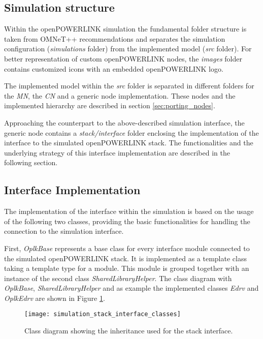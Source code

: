 \subsection{Simulation structure}
\label{sec:porting_stack_simstructure}
Within the openPOWERLINK simulation the fundamental folder structure is taken from OMNeT++ recommendations and separates the simulation configuration (\emph{simulations} folder) from the implemented model (\emph{src} folder).
For better representation of custom openPOWERLINK nodes, the \emph{images} folder contains customized icons with an embedded openPOWERLINK logo.

The implemented model within the \emph{src} folder is separated in different folders for the \emph{MN}, the \emph{CN} and a generic node implementation.
These nodes and the implemented hierarchy are described in section \ref{sec:porting_nodes}.

Approaching the counterpart to the above-described simulation interface, the generic node contains a \emph{stack/interface} folder enclosing the implementation of the interface to the simulated openPOWERLINK stack.
The functionalities and the underlying strategy of this interface implementation are described in the following section.

\subsection{Interface Implementation}
\label{sec:porting_stack_interface}
The implementation of the interface within the simulation is based on the usage of the following two classes, providing the basic functionalities for handling the connection to the simulation interface.

First, \emph{OplkBase} represents a base class for every interface module connected to the simulated openPOWERLINK stack.
It is implemented as a template class taking a template type for a module.
This module is grouped together with an instance of the second class \emph{SharedLibraryHelper}.
The class diagram with \emph{OplkBase}, \emph{SharedLibraryHelper} and as example the implemented classes \emph{Edrv} and \emph{OplkEdrv} are shown in Figure \ref{fig:simulation_stack_interface_classes}.

\begin{figure}
    \centering
    \texttt{[image: simulation\_stack\_interface\_classes]}
    \caption{Class diagram showing the inheritance used for the stack interface.}
    \label{fig:simulation_stack_interface_classes}
\end{figure}


